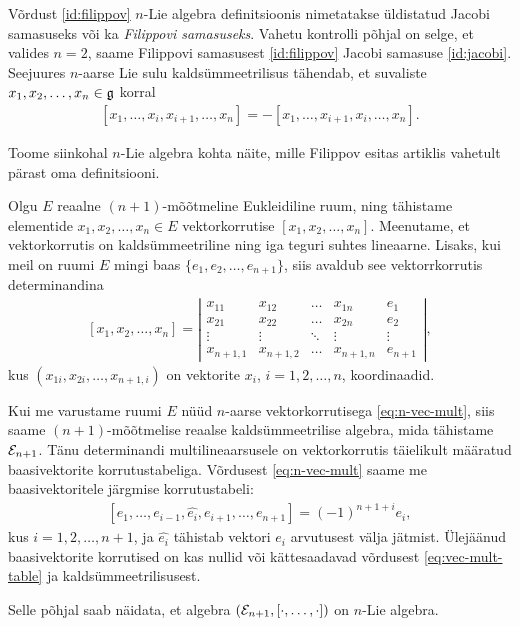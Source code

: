 Võrdust \eqref{id:filippov} $n$-Lie algebra definitsioonis
nimetatakse üldistatud Jacobi samasuseks või ka
\emph{Filippovi samasuseks}. Vahetu kontrolli põhjal
on selge, et valides $n = 2$, saame Filippovi samasusest
\eqref{id:filippov} Jacobi samasuse \eqref{id:jacobi}. Seejuures
$n$-aarse Lie sulu kaldsümmeetrilisus tähendab, et
suvaliste $x_1, x_2, \dots, x_n \in \mathfrak{g}$ korral
\begin{align}\label{def:n-lie-brac-antisymm}
    [x_1, \dots, x_i, x_{i+1}, \dots, x_n] =
    -[x_1, \dots, x_{i+1}, x_i, \dots, x_n].
\end{align}

Toome siinkohal $n$-Lie algebra kohta näite, mille
Filippov esitas artiklis \cite{filippov1985} vahetult
pärast oma definitsiooni.

\begin{naide}
    Olgu $E$ reaalne $(n+1)$-mõõtmeline Eukleidiline ruum,
    ning tähistame elementide $x_1, x_2, \dots, x_n \in E$
    vektorkorrutise $[x_1, x_2, \dots, x_n]$. Meenutame, 
    et vektorkorrutis on kaldsümmeetriline ning iga teguri
    suhtes lineaarne. Lisaks, kui meil on ruumi $E$ mingi
    baas $\{e_1, e_2, \dots, e_{n+1}\}$, siis avaldub see
    vektorrkorrutis determinandina
    \begin{align}\label{eq:n-vec-mult}
        [x_1, x_2, \dots, x_n] = \left|\begin{matrix}
          x_{11}    & x_{12}    & \dots  & x_{1n}    & e_1    \\
          x_{21}    & x_{22}    & \dots  & x_{2n}    & e_2    \\
          \vdots    & \vdots    & \ddots & \vdots    & \vdots \\
          x_{n+1,1} & x_{n+1,2} & \dots  & x_{n+1,n} & e_{n+1}
        \end{matrix}\right|,
    \end{align}
    kus $(x_{1i}, x_{2i}, \dots, x_{n+1,i})$ on vektorite
    $x_i$, $i = 1, 2, \dots, n$, koordinaadid.

    Kui me varustame ruumi $E$ nüüd $n$-aarse vektorkorrutisega
    \eqref{eq:n-vec-mult}, siis saame $(n+1)$-mõõtmelise
    reaalse kaldsümmeetrilise algebra, mida tähistame
    $\mathcal{E}_{n+1}$. Tänu determinandi multilineaarsusele on
    vektorkorrutis täielikult määratud baasivektorite
    korrutustabeliga. Võrdusest \eqref{eq:n-vec-mult} saame
    me baasivektoritele järgmise korrutustabeli:
    \begin{align}\label{eq:vec-mult-table}
        [e_1, \dots, e_{i-1}, \hat{e_i}, e_{i+1}, \dots, e_{n+1}]
        = (-1)^{n+1+i} e_i,
    \end{align}
    kus $i = 1, 2, \dots, n+1$, ja $\hat{e_i}$ tähistab
    vektori $e_i$ arvutusest välja jätmist. Ülejäänud
    baasivektorite korrutised on kas nullid või kättesaadavad
    võrdusest \eqref{eq:vec-mult-table} ja
    kaldsümmeetrilisusest.

    Selle põhjal saab näidata, et algebra
    $(\mathcal{E}_{n+1}, [\cdot, \dots, \cdot])$ on $n$-Lie
    algebra. \cite{filippov1985}
\end{naide}


